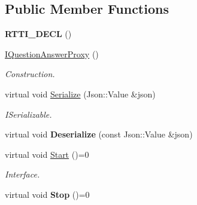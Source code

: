 \subsection*{Public Member Functions}
\begin{DoxyCompactItemize}
\item 
\mbox{\label{class_i_question_answer_proxy_a192ee92c414af1292a52b644a75b6fa3}} 
{\bfseries R\+T\+T\+I\+\_\+\+D\+E\+CL} ()
\item 
\mbox{\label{class_i_question_answer_proxy_ac1da38ac6fefc852844022816e3e0416}} 
\hyperlink{class_i_question_answer_proxy_ac1da38ac6fefc852844022816e3e0416}{I\+Question\+Answer\+Proxy} ()
\begin{DoxyCompactList}\small\item\em Construction. \end{DoxyCompactList}\item 
\mbox{\label{class_i_question_answer_proxy_aec161c372a770ef483db88b095ae590d}} 
virtual void \hyperlink{class_i_question_answer_proxy_aec161c372a770ef483db88b095ae590d}{Serialize} (Json\+::\+Value \&json)
\begin{DoxyCompactList}\small\item\em I\+Serializable. \end{DoxyCompactList}\item 
\mbox{\label{class_i_question_answer_proxy_a147d5e869d44441afe1aa7bb9f72246a}} 
virtual void {\bfseries Deserialize} (const Json\+::\+Value \&json)
\item 
\mbox{\label{class_i_question_answer_proxy_afc0ec358c055679097e1296e295270fb}} 
virtual void \hyperlink{class_i_question_answer_proxy_afc0ec358c055679097e1296e295270fb}{Start} ()=0
\begin{DoxyCompactList}\small\item\em Interface. \end{DoxyCompactList}\item 
\mbox{\label{class_i_question_answer_proxy_ac8253edf03de82b4cf208281509c1c6e}} 
virtual void {\bfseries Stop} ()=0
\item 
\mbox{\label{class_i_question_answer_proxy_a0455a97ac2858241e636ee418d4b1c48}} 

\end{DoxyCompactItemize}
